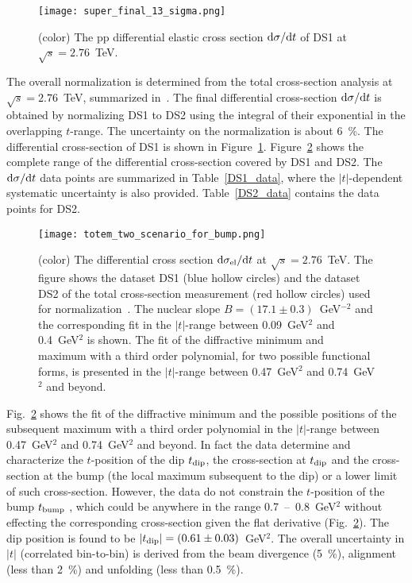 \documentclass[TOTEM]{cernphprep}
\begin{document}
	\begin{figure}[H]
		\texttt{[image: super\_final\_13\_sigma.png]}
		\caption{(color) The pp differential elastic cross section ${\rm d}\sigma/{\rm d}t$ of DS1 at $\sqrt{s}=2.76$~TeV.}
		\label{differential_cross_section}
	\end{figure}
	
	The overall normalization is determined from the total cross-section analysis at $\sqrt{s}=2.76$~TeV, summarized in~\cite{Antchev:2017dia,Paper_2p76}. The final differential cross-section
	${\rm d}\sigma/{\rm d}t$ is obtained by normalizing DS1 to DS2 using the integral of their exponential in the overlapping $t$-range. The uncertainty on the normalization is about 6~\%. The
	differential cross-section of DS1 is shown in Figure~\ref{differential_cross_section}. Figure~\ref{differential_cross_section_normalization} shows the complete range of the differential cross-section
	covered by DS1 and DS2.
	The ${\rm d}\sigma/{\rm d}t$ data points are summarized in Table~\ref{DS1_data}, where the $|t|$-dependent systematic uncertainty is also provided. Table~\ref{DS2_data} contains
	the data points for DS2.
	\begin{figure*}[h]
		\texttt{[image: totem\_two\_scenario\_for\_bump.png]}
		\caption{(color) The differential cross section ${\rm d}\sigma_{\rm el}/{\rm d}t$ at $\sqrt{s}=2.76$~TeV. The figure shows the dataset DS1 (blue hollow circles) and the dataset DS2
		of the total cross-section measurement (red hollow circles) used for normalization~\cite{Antchev:2017dia,Paper_2p76,Nemes:2017gut}. The nuclear slope $B=(17.1\pm0.3)$~GeV$^{-2}$ and the corresponding fit in the $|t|$-range between 0.09~GeV$^{2}$ and 0.4~GeV$^{2}$ is shown. The
		fit of the diffractive minimum and maximum with a third order polynomial, for two possible functional forms, is presented in the $|t|$-range between 0.47~GeV$^{2}$ and 0.74~GeV$^{2}$ and beyond.}
		\label{differential_cross_section_normalization}
	\end{figure*}

 	Fig.~\ref{differential_cross_section_normalization} shows the fit of the diffractive minimum and the possible positions of the subsequent maximum with a third order polynomial in the $|t|$-range between 0.47~GeV$^{2}$ and 0.74~GeV$^{2}$ and beyond. In fact
	the data determine and characterize the $t$-position of the dip $t_{\rm dip}$, the cross-section at $t_{\rm dip}$ and the cross-section at the bump (the local maximum subsequent to the dip) or a lower limit of such cross-section. However, the data do not constrain the $t$-position of the bump $t_{\rm bump}$ , which 
	could be anywhere in the range 0.7~--~0.8~GeV$^{2}$ without effecting the corresponding cross-section given the flat derivative (Fig.~\ref{differential_cross_section_normalization}). The dip position is found to be
	$|t_{\rm dip}|=(0.61\pm0.03)$~GeV$^{2}$. The overall uncertainty in $|t|$ (correlated bin-to-bin) is derived from the beam divergence (5~\%), alignment (less than 2~\%) and unfolding (less than 0.5~\%). 
\end{document}
